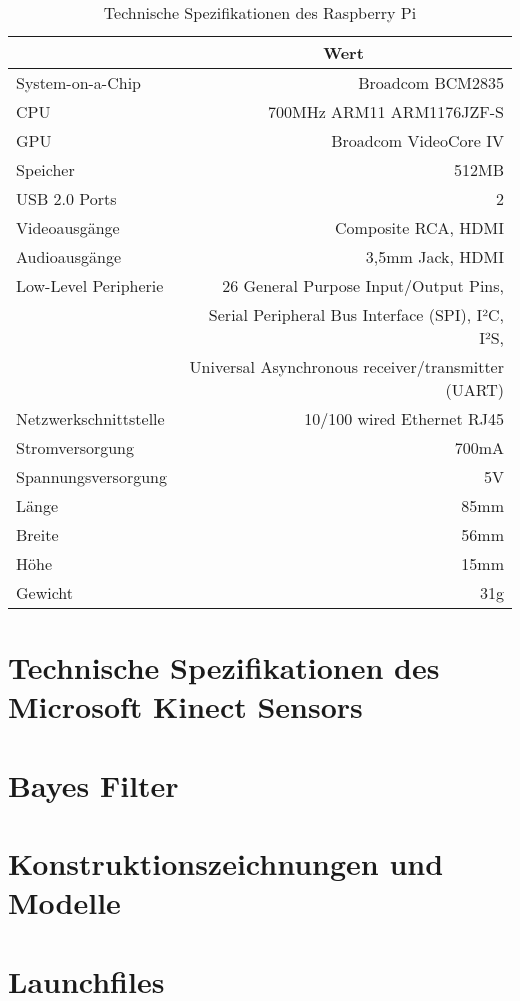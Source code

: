 \begin{table}[ht]
\caption{Technische Spezifikationen des Raspberry Pi}
\begin{center}
\begin{tabular}{|l|r|}
\hline
\rowcolor{lightgray} \multicolumn{1}{|c|}{\textbf{Spezifikation}} & \multicolumn{1}{|c|}{\textbf{Wert}}\\
\hline
System-on-a-Chip & Broadcom BCM2835\\
\hline
CPU & 700MHz ARM11 ARM1176JZF-S\\
\hline
GPU & Broadcom VideoCore IV\\
\hline
Speicher & 512MB\\
\hline
USB 2.0 Ports & 2\\
\hline
Videoausgänge & Composite RCA, HDMI\\
\hline
Audioausgänge & 3,5mm Jack, HDMI\\
\hline
Low-Level Peripherie & 26 General Purpose Input/Output Pins,\\
& Serial Peripheral Bus Interface (SPI), I²C, I²S,\\
& Universal Asynchronous receiver/transmitter (UART)\\
\hline
Netzwerkschnittstelle & 10/100 wired Ethernet RJ45\\
\hline
Stromversorgung & 700mA\\
\hline
Spannungsversorgung & 5V\\
\hline
Länge & 85mm\\
\hline
Breite & 56mm\\
\hline
Höhe & 15mm\\
\hline
Gewicht & 31g\\
\hline
\end{tabular}
\end{center}
\label{tab:raspberry}
\end{table}

\clearpage{}

\section{Technische Spezifikationen des Microsoft Kinect Sensors}
\label{app:kinect}

\clearpage{}

\section{Bayes Filter}
\label{app:bayes}

\clearpage{}

\section{Konstruktionszeichnungen und Modelle}
\label{app:construction}

\clearpage{}

\section{Launchfiles}
\label{app:launchfiles}